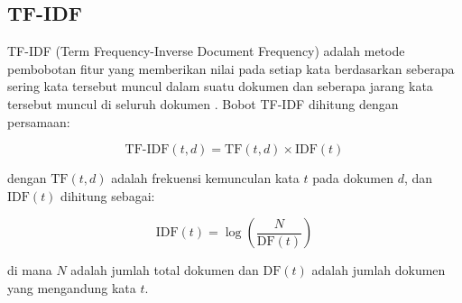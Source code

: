 \subsection{TF-IDF}

TF-IDF (Term Frequency-Inverse Document Frequency) adalah metode pembobotan fitur yang memberikan nilai pada setiap kata berdasarkan seberapa sering kata tersebut muncul dalam suatu dokumen dan seberapa jarang kata tersebut muncul di seluruh dokumen \cite{manning2008}. Bobot TF-IDF dihitung dengan persamaan:

\begin{equation}
\text{TF-IDF}(t,d) = \text{TF}(t,d) \times \text{IDF}(t)
\end{equation}

dengan $\text{TF}(t,d)$ adalah frekuensi kemunculan kata $t$ pada dokumen $d$, dan $\text{IDF}(t)$ dihitung sebagai:

\begin{equation}
\text{IDF}(t) = \log\left(\frac{N}{\text{DF}(t)}\right)
\end{equation}

di mana $N$ adalah jumlah total dokumen dan $\text{DF}(t)$ adalah jumlah dokumen yang mengandung kata $t$.
